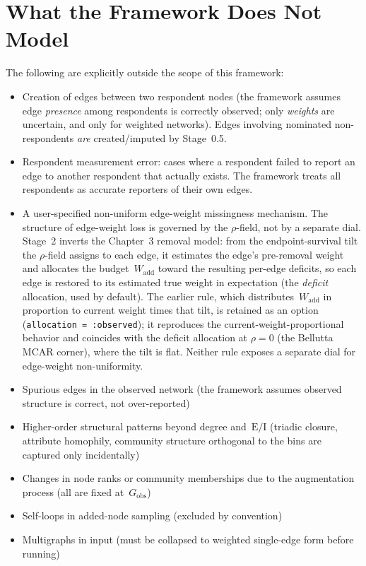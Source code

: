 \documentclass[11pt]{article}
\newcommand{\Gobs}{G_{\text{obs}}}
\newcommand{\Wadd}{W_{\text{add}}}
\newcommand{\EI}{\text{E/I}}
\begin{document}
\section{What the Framework Does Not Model}

The following are explicitly outside the scope of this framework:

\begin{itemize}[leftmargin=*, itemsep=2pt]
\item Creation of edges between two respondent nodes (the framework assumes edge \emph{presence} among respondents is correctly observed; only \emph{weights} are uncertain, and only for weighted networks). Edges involving nominated non-respondents \emph{are} created/imputed by Stage~0.5.
\item Respondent measurement error: cases where a respondent failed to report an edge to another respondent that actually exists. The framework treats all respondents as accurate reporters of their own edges.
\item A user-specified non-uniform edge-weight missingness mechanism. The structure of edge-weight loss is governed by the $\rho$-field, not by a separate dial. Stage~2 inverts the Chapter~3 removal model: from the endpoint-survival tilt the $\rho$-field assigns to each edge, it estimates the edge's pre-removal weight and allocates the budget~$\Wadd$ toward the resulting per-edge deficits, so each edge is restored to its estimated true weight in expectation (the \emph{deficit} allocation, used by default). The earlier rule, which distributes~$\Wadd$ in proportion to current weight times that tilt, is retained as an option (\texttt{allocation = :observed}); it reproduces the current-weight-proportional behavior and coincides with the deficit allocation at $\rho = 0$ (the Bellutta MCAR corner), where the tilt is flat. Neither rule exposes a separate dial for edge-weight non-uniformity.
\item Spurious edges in the observed network (the framework assumes observed structure is correct, not over-reported)
\item Higher-order structural patterns beyond degree and~$\EI$ (triadic closure, attribute homophily, community structure orthogonal to the bins are captured only incidentally)
\item Changes in node ranks or community memberships due to the augmentation process (all are fixed at~$\Gobs$)
\item Self-loops in added-node sampling (excluded by convention)
\item Multigraphs in input (must be collapsed to weighted single-edge form before running)

\end{itemize}
\end{document}
